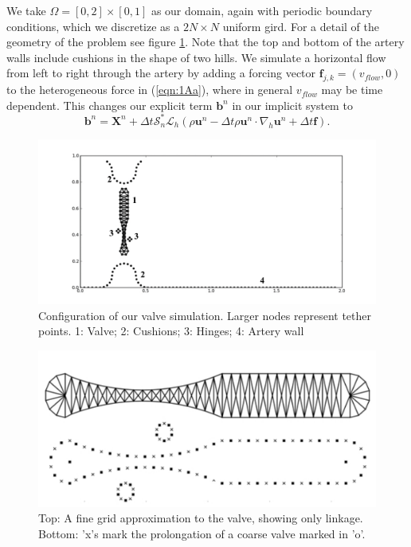 \documentclass[preprint,12pt]{elsarticle}
\begin{document}
We take $\Omega=[0,2]\times[0,1]$ as our domain, again with periodic boundary conditions, which we discretize as a $2N\times N$ uniform gird. For a detail of the geometry of the problem see figure \ref{fig:ValveGeometry}. Note that the top and bottom of the artery walls include cushions in the shape of two hills. We simulate a horizontal flow from left to right through the artery by adding a forcing vector $\mathbf{f}_{j,k}=(v_{flow},0)$ to the heterogeneous force in (\ref{eqn:1Aa}), where in general $v_{flow}$ may be time dependent. This changes our explicit term $\mathbf{b}^n$ in our implicit system to
\begin{equation}
\mathbf{b}^n=\mathbf{X}^n + \Delta t\mathcal{S}^*_n\mathcal{L}_h(\rho\mathbf{u}^n - \Delta t\rho\mathbf{u}^n \cdot \nabla_h \mathbf{u}^n + \Delta t \mathbf{f}).
\end{equation}
\begin{figure}[!b]
  \begin{center}
    \includegraphics[bb=1in .3in 11.5in 5.85in,width=5.25in,clip]{ValveGeometry.pdf}
  \end{center}
  \caption{\small Configuration of our valve simulation. Larger nodes represent tether points. 1: Valve; 2: Cushions; 3: Hinges; 4: Artery wall}
  \label{fig:ValveGeometry}
\end{figure}
\begin{figure}[!b]
  \begin{center}
    \includegraphics[bb=0in 0in 7.25in 3.3in,width=5.25in,clip]{Valve1.pdf}
  \end{center}
  \caption{\small Top: A fine grid approximation to the valve, showing only linkage. Bottom: 'x's mark the prolongation of a coarse valve marked in 'o'.}
  \label{fig:Valve1}
\end{figure}
\end{document}
